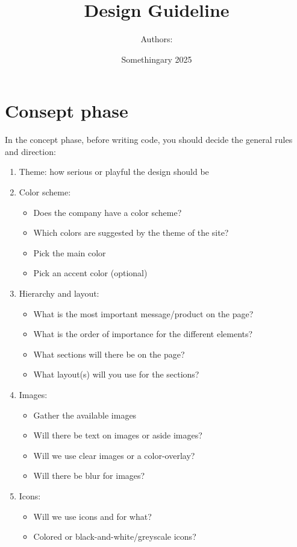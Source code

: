 \documentclass{article}
\title{Design Guideline}
\author{Authors: }
\date{Somethingary 2025}
\begin{document}
\maketitle

\newpage
\section{Consept phase}
In the concept phase, before writing code, you should decide the general rules and direction:
\begin{enumerate}
    \item Theme: how serious or playful the design should be
    \item Color scheme:
    \begin{itemize}
        \item Does the company have a color scheme?
        \item Which colors are suggested by the theme of the site?
        \item Pick the main color
        \item Pick an accent color (optional)
    \end{itemize}
    \item Hierarchy and layout:
    \begin{itemize}
        \item What is the most important message/product on the page?
        \item What is the order of importance for the different elements?
        \item What sections will there be on the page?
        \item What layout(s) will you use for the sections?
    \end{itemize}
    \item Images:
    \begin{itemize}
        \item Gather the available images
        \item Will there be text on images or aside images?
        \item Will we use clear images or a color-overlay?
        \item Will there be blur for images?
    \end{itemize}
    \item Icons:
    \begin{itemize}
        \item Will we use icons and for what?
        \item Colored or black-and-white/greyscale icons?

\end{itemize}
\end{enumerate}
\end{document}
